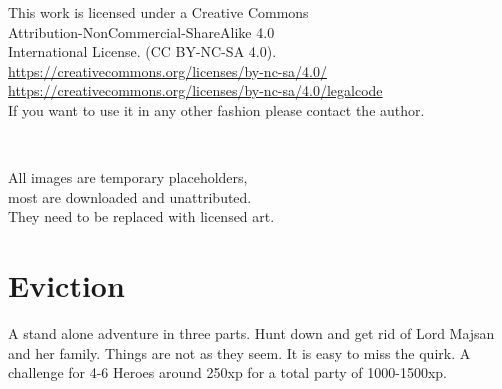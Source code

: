 \clearpage
\thispagestyle{empty}
\raggedbottom

\vsmall
\noindent
This work is licensed under a Creative Commons \\
Attribution-NonCommercial-ShareAlike 4.0 \\
International License. (CC BY-NC-SA 4.0).\\
\url{https://creativecommons.org/licenses/by-nc-sa/4.0/} \\
\url{https://creativecommons.org/licenses/by-nc-sa/4.0/legalcode} \\
If you want to use it in any other fashion please contact the author.

\

\noindent
All images are temporary placeholders, \\
most are downloaded and unattributed.\\
They need to be replaced with licensed art.

\normalsize






\cleardoublepage
\pagestyle{fancy}
\raggedbottom



\section*{Eviction}
A stand alone adventure in three parts. Hunt down and get rid of Lord Majsan and her family. Things are not as they seem. It is easy to miss the quirk. A challenge for 4-6 Heroes around 250xp for a total party of 1000-1500xp.

\vspace{1.0\baselineskip}

\tableofcontents
{}

\vspace{2.0\baselineskip}

